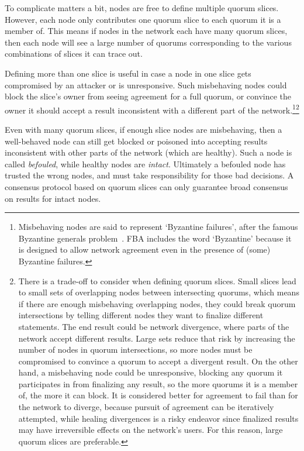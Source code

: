To complicate matters a bit, nodes are free to define multiple quorum slices. However, each node only contributes one quorum slice to each quorum it is a member of. This means if nodes in the network each have many quorum slices, then each node will see a large number of quorums corresponding to the various combinations of slices it can trace out.

Defining more than one slice is useful in case a node in one slice gets compromised by an attacker or is unresponsive. Such misbehaving nodes could block the slice's owner from seeing agreement for a full quorum, or convince the owner it should accept a result inconsistent with a different part of the network.\footnote{Misbehaving nodes are said to represent `Byzantine failures', after the famous Byzantine generals problem~\cite{byzantine-generals-lamport}. FBA includes the word `Byzantine' because it is designed to allow network agreement even in the presence of (some) Byzantine failures.}\footnote{There is a trade-off to consider when defining quorum slices. Small slices lead to small sets of overlapping nodes between intersecting quorums, which means if there are enough misbehaving overlapping nodes, they could break quorum intersections by telling different nodes they want to finalize different statements. The end result could be network divergence, where parts of the network accept different results. Large sets reduce that risk by increasing the number of nodes in quorum intersections, so more nodes must be compromised to convince a quorum to accept a divergent result. On the other hand, a misbehaving node could be unresponsive, blocking any quorum it participates in from finalizing any result, so the more quorums it is a member of, the more it can block. It is considered better for agreement to fail than for the network to diverge, because pursuit of agreement can be iteratively attempted, while healing divergences is a risky endeavor since finalized results may have irreversible effects on the network's users. For this reason, large quorum slices are preferable.}

Even with many quorum slices, if enough slice nodes are misbehaving, then a well-behaved node can still get blocked or poisoned into accepting results inconsistent with other parts of the network (which are healthy). Such a node is called {\em befouled}, while healthy nodes are {\em intact}. Ultimately a befouled node has trusted the wrong nodes, and must take responsibility for those bad decisions. A consensus protocol based on quorum slices can only guarantee broad consensus on results for intact nodes.


